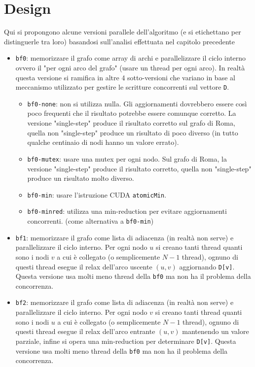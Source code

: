 \documentclass{article}
\begin{document}
	\section{Design}
	\label{section:design}
	Qui si propongono alcune versioni parallele dell'algoritmo (e si etichettano per distinguerle tra loro) basandosi sull'analisi effettuata nel capitolo precedente
	
	\begin{itemize}
		\item \texttt{bf0}: memorizzare il grafo come array di archi e parallelizzare il ciclo interno ovvero il "per ogni arco del grafo" (usare un thread per ogni arco). In realtà questa versione si ramifica in altre 4 sotto-versioni che variano in base al meccanismo utilizzato per gestire le scritture concorrenti sul vettore \texttt{D}.
		\begin{itemize}
			\item \texttt{bf0-none}: non si utilizza nulla. Gli aggiornamenti dovrebbero essere così poco frequenti che il risultato potrebbe essere comunque corretto. La versione "single-step" produce il risultato corretto sul grafo di Roma, quella non "single-step" produce un risultato di poco diverso (in tutto qualche centinaio di nodi hanno un valore errato).
			\item \texttt{bf0-mutex}: usare una mutex per ogni nodo. Sul grafo di Roma, la versione "single-step" produce il risultato corretto, quella non "single-step" produce un risultato molto diverso.
			\item \texttt{bf0-min}: usare l'istruzione CUDA \texttt{atomicMin}.
			\item \texttt{bf0-minred}: utilizza una min-reduction per evitare aggiornamenti concorrenti. (come alternativa a \texttt{bf0-min})
		\end{itemize}
	
		\item \texttt{bf1}: memorizzare il grafo come lista di adiacenza (in realtà non serve) e parallelizzare il ciclo interno. Per ogni nodo $u$ si creano tanti thread quanti sono i nodi $v$ a cui è collegato (o semplicemente $N-1$ thread), ognuno di questi thread esegue il relax dell'arco uscente $(u,v)$ aggiornando \texttt{D[v]}. Questa versione usa molti meno thread della \texttt{bf0} ma non ha il problema della concorrenza.
		
		\item \texttt{bf2}: memorizzare il grafo come lista di adiacenza (in realtà non serve) e parallelizzare il ciclo interno. Per ogni nodo $v$ si creano tanti thread quanti sono i nodi $u$ a cui è collegato (o semplicemente $N-1$ thread), ognuno di questi thread esegue il relax dell'arco entrante $(u,v)$ mantenendo un valore parziale, infine si opera una min-reduction per determinare \texttt{D[v]}. Questa versione usa molti meno thread della \texttt{bf0} ma non ha il problema della concorrenza.
	\end{itemize}
\end{document}
